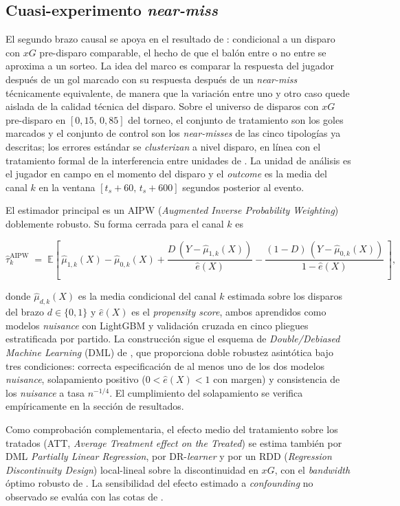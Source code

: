 \subsection{Cuasi-experimento \textit{near-miss}}

El segundo brazo causal se apoya en el resultado de
\textcite{GauriotPage2019}: condicional a un disparo con $xG$
pre-disparo comparable, el hecho de que el balón entre o no entre se
aproxima a un sorteo. La idea del marco es comparar la respuesta del
jugador después de un gol marcado con su respuesta después de un
\textit{near-miss} técnicamente equivalente, de manera que la
variación entre uno y otro caso quede aislada de la calidad técnica
del disparo. Sobre el universo de disparos con $xG$ pre-disparo en
$[0{,}15,\, 0{,}85]$ del torneo, el conjunto de tratamiento son los
goles marcados y el conjunto de control son los \textit{near-misses}
de las cinco tipologías ya descritas; los errores estándar se
\textit{clusterizan} a nivel disparo, en línea con el tratamiento
formal de la interferencia entre unidades de
\textcite{HudgensHalloran2008}. La unidad de análisis es el jugador
en campo en el momento del disparo y el \textit{outcome} es la media
del canal $k$ en la ventana $[t_s + 60,\, t_s + 600]$ segundos
posterior al evento.

El estimador principal es un AIPW (\textit{Augmented Inverse
Probability Weighting}) doblemente robusto. Su forma cerrada para el
canal $k$ es

\[
\hat{\tau}^{\text{AIPW}}_k \;=\; \mathbb{E}\left[\,\hat{\mu}_{1,k}(X) - \hat{\mu}_{0,k}(X) + \frac{D\,(Y - \hat{\mu}_{1,k}(X))}{\hat{e}(X)} - \frac{(1-D)\,(Y - \hat{\mu}_{0,k}(X))}{1 - \hat{e}(X)}\,\right],
\]

donde $\hat{\mu}_{d,k}(X)$ es la media condicional del canal $k$
estimada sobre los disparos del brazo $d \in \{0,1\}$ y $\hat{e}(X)$
es el \textit{propensity score}, ambos aprendidos como modelos
\textit{nuisance} con LightGBM y validación cruzada en cinco pliegues
estratificada por partido. La construcción sigue el esquema de
\textit{Double/Debiased Machine Learning} (DML) de
\textcite{Chernozhukov2018DML}, que proporciona doble robustez
asintótica bajo tres condiciones: correcta especificación de al menos
uno de los dos modelos \textit{nuisance}, solapamiento positivo
($0 < \hat{e}(X) < 1$ con margen) y consistencia de los
\textit{nuisance} a tasa $n^{-1/4}$. El cumplimiento del solapamiento
se verifica empíricamente en la sección de resultados.

Como comprobación complementaria, el efecto medio del tratamiento
sobre los tratados (ATT, \textit{Average Treatment effect on the
Treated}) se estima también por DML \textit{Partially Linear
Regression}, por DR-\textit{learner} \parencite{Kennedy2023DR} y por un
RDD (\textit{Regression Discontinuity Design}) local-lineal sobre la
discontinuidad en $xG$, con el \textit{bandwidth} óptimo robusto de
\textcite{CalonicoCattaneoTitiunik2014}. La sensibilidad del efecto
estimado a \textit{confounding} no observado se evalúa con las cotas
de \textcite{CinelliHazlett2020}.

